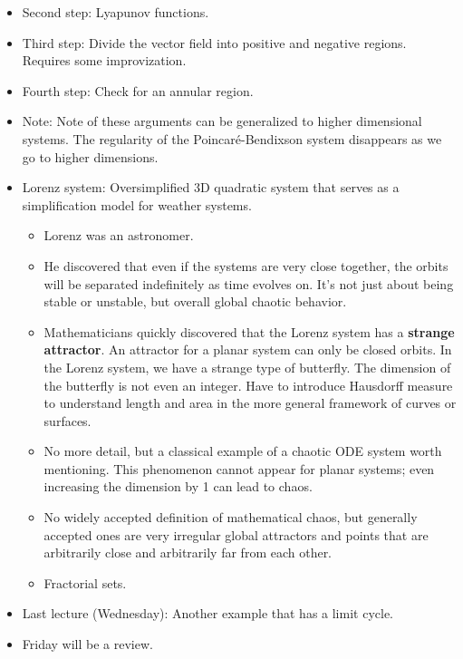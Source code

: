 \documentclass[../notes.tex]{subfiles}
\begin{document}
\begin{itemize}
    \item Second step: Lyapunov functions.
    \item Third step: Divide the vector field into positive and negative regions. Requires some improvization.
    \item Fourth step: Check for an annular region.
    \item Note: Note of these arguments can be generalized to higher dimensional systems. The regularity of the Poincar\'{e}-Bendixson system disappears as we go to higher dimensions.
    \item Lorenz system: Oversimplified 3D quadratic system that serves as a simplification model for weather systems.
    \begin{itemize}
        \item Lorenz was an astronomer.
        \item He discovered that even if the systems are very close together, the orbits will be separated indefinitely as time evolves on. It's not just about being stable or unstable, but overall global chaotic behavior.
        \item Mathematicians quickly discovered that the Lorenz system has a \textbf{strange attractor}. An attractor for a planar system can only be closed orbits. In the Lorenz system, we have a strange type of butterfly. The dimension of the butterfly is not even an integer. Have to introduce Hausdorff measure to understand length and area in the more general framework of curves or surfaces.
        \item No more detail, but a classical example of a chaotic ODE system worth mentioning. This phenomenon cannot appear for planar systems; even increasing the dimension by 1 can lead to chaos.
        \item No widely accepted definition of mathematical chaos, but generally accepted ones are very irregular global attractors and points that are arbitrarily close and arbitrarily far from each other.
        \item Fractorial sets.
    \end{itemize}
    \item Last lecture (Wednesday): Another example that has a limit cycle.
    \item Friday will be a review.
\end{itemize}
\end{document}
